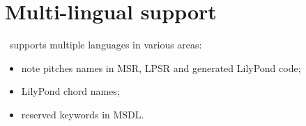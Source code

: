 



\chapter{Multi-lingual support}


\mf\ supports multiple languages in various areas:
\begin{itemize}
\item note pitches names in MSR, LPSR and generated LilyPond code;
\item LilyPond chord names;
\item reserved keywords in MSDL.
\end{itemize}
